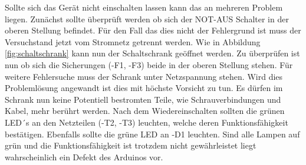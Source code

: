 Sollte sich das Gerät nicht einschalten lassen kann das an mehreren Problem liegen. Zunächst sollte überprüft werden ob sich der NOT-AUS Schalter in der oberen Stellung befindet. Für den Fall das dies nicht der Fehlergrund ist  muss der Versuchstand jetzt vom Stromnetz getrennt werden. Wie in Abbildung \ref{fig:schaltschrank} kann nun der Schaltschrank geöffnet werden. Zu überprüfen ist nun ob sich die Sicherungen (-F1, -F3) beide in der oberen Stellung stehen. Für weitere Fehlersuche muss der Schrank unter Netzspannung stehen. Wird dies Problemlösung angewandt ist dies mit höchste Vorsicht zu tun. Es dürfen im Schrank nun keine Potentiell bestromten Teile, wie Schrauverbindungen und Kabel, mehr berührt werden. Nach dem Wiedereinschalten  sollten die grünen LED´s an den Netzteilen (-T2, -T3) leuchten, welche deren Funktionsfähigkeit bestätigen. Ebenfalls sollte die grüne LED an -D1 leuchten. Sind alle Lampen auf grün und die Funktionsfähigkeit ist trotzdem nicht gewährleistet liegt wahrscheinlich ein Defekt des Arduinos vor. 
